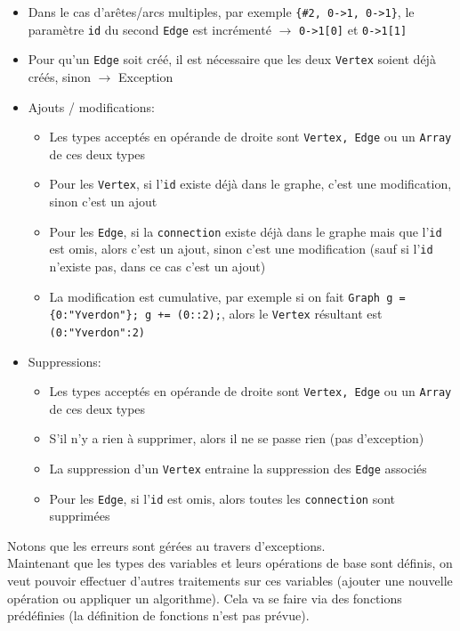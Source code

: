 \documentclass[french]{article}
\begin{document}
\begin{itemize}
\begin{itemize}
						\item Dans le cas d'arêtes/arcs multiples, par exemple \texttt{\{\#2, 0->1, 0->1\}}, le paramètre \texttt{id} du second \texttt{Edge} est incrémenté $\rightarrow$ \texttt{0->1[0]} et \texttt{0->1[1]}
						\item Pour qu'un \texttt{Edge} soit créé, il est nécessaire que les deux \texttt{Vertex} soient déjà créés, sinon $\rightarrow$ Exception
						\item Ajouts / modifications:
						\begin{itemize}
							\item Les types acceptés en opérande de droite sont \texttt{Vertex, Edge} ou un \texttt{Array} de ces deux types
							\item Pour les \texttt{Vertex}, si l'\texttt{id} existe déjà dans le graphe, c'est une modification, sinon c'est un ajout
							\item Pour les \texttt{Edge}, si la \texttt{connection} existe déjà dans le graphe mais que l'\texttt{id} est omis, alors c'est un ajout, sinon c'est une modification (sauf si l'\texttt{id} n'existe pas, dans ce cas c'est un ajout)
							\item La modification est cumulative, par exemple si on fait \texttt{Graph g = \{0:"Yverdon"\}; g += (0::2);}, alors le \texttt{Vertex} résultant est \texttt{(0:"Yverdon":2)}
						\end{itemize}
						\item Suppressions:
						\begin{itemize}
							\item Les types acceptés en opérande de droite sont \texttt{Vertex, Edge} ou un \texttt{Array} de ces deux types
							\item S'il n'y a rien à supprimer, alors il ne se passe rien (pas d'exception)
							\item La suppression d'un \texttt{Vertex} entraine la suppression des \texttt{Edge} associés
							\item Pour les \texttt{Edge}, si l'\texttt{id} est omis, alors toutes les \texttt{connection} sont supprimées
						\end{itemize}
					\end{itemize}
				\end{itemize}
				
				Notons que les erreurs sont gérées au travers d'exceptions.\\
				
				Maintenant que les types des variables et leurs opérations de base sont définis, on veut pouvoir effectuer d'autres traitements sur ces variables (ajouter une nouvelle opération ou appliquer un algorithme). Cela va se faire via des fonctions prédéfinies (la définition de fonctions n'est pas prévue).\\
				
\end{document}
